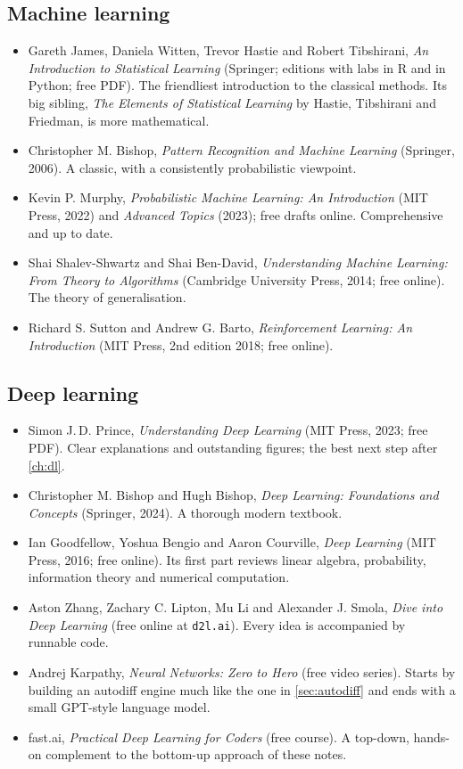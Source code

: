 \subsection{Machine learning}

\begin{itemize}[itemsep=3pt]
  \item Gareth James, Daniela Witten, Trevor Hastie and Robert Tibshirani,
    \emph{An Introduction to Statistical Learning} (Springer; editions with labs in
    R and in Python; free PDF). The friendliest introduction to the classical
    methods. Its big sibling, \emph{The Elements of Statistical Learning} by
    Hastie, Tibshirani and Friedman, is more mathematical.
  \item Christopher M. Bishop, \emph{Pattern Recognition and Machine Learning}
    (Springer, 2006). A classic, with a consistently probabilistic viewpoint.
  \item Kevin P. Murphy, \emph{Probabilistic Machine Learning: An Introduction}
    (MIT Press, 2022) and \emph{Advanced Topics} (2023); free drafts online.
    Comprehensive and up to date.
  \item Shai Shalev-Shwartz and Shai Ben-David, \emph{Understanding Machine
    Learning: From Theory to Algorithms} (Cambridge University Press, 2014; free
    online). The theory of generalisation.
  \item Richard S. Sutton and Andrew G. Barto, \emph{Reinforcement Learning: An
    Introduction} (MIT Press, 2nd edition 2018; free online).
\end{itemize}

\subsection{Deep learning}

\begin{itemize}[itemsep=3pt]
  \item Simon J.\,D. Prince, \emph{Understanding Deep Learning} (MIT Press, 2023;
    free PDF). Clear explanations and outstanding figures; the best next step
    after \cref{ch:dl}.
  \item Christopher M. Bishop and Hugh Bishop, \emph{Deep Learning: Foundations
    and Concepts} (Springer, 2024). A thorough modern textbook.
  \item Ian Goodfellow, Yoshua Bengio and Aaron Courville, \emph{Deep Learning}
    (MIT Press, 2016; free online). Its first part reviews linear algebra,
    probability, information theory and numerical computation.
  \item Aston Zhang, Zachary C. Lipton, Mu Li and Alexander J. Smola, \emph{Dive
    into Deep Learning} (free online at \texttt{d2l.ai}). Every idea is accompanied
    by runnable code.
  \item Andrej Karpathy, \emph{Neural Networks: Zero to Hero} (free video series).
    Starts by building an autodiff engine much like the one in \cref{sec:autodiff}
    and ends with a small GPT-style language model.
  \item fast.ai, \emph{Practical Deep Learning for Coders} (free course). A
    top-down, hands-on complement to the bottom-up approach of these notes.
\end{itemize}

